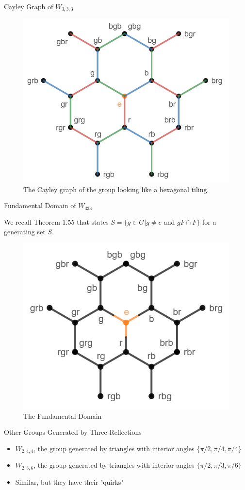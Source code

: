 \documentclass[usenames,dvipsnames]{beamer}
\begin{document}
\begin{frame}{Cayley Graph of $W_{3,3,3}$}
\begin{figure}[h]
    \centering
    \includegraphics[width=.6\textwidth]{images/6-06-rbg_rbg_3-cayley.png}
    \caption{The Cayley graph of the group looking like a hexagonal tiling.}
\end{figure}

\end{frame}

\begin{frame}{Fundamental Domain of $W_{333}$}

We recall Theorem 1.55 that states $S=\{g\in G | g \ne e$ and $gF \cap F\}$ for a generating set $S$.

\pause{}

\begin{figure}[h]
    \centering
    \includegraphics[width=.55\textwidth]{images/6-07-rbg_rbg_3-fundamental_domain.png}
    \caption{The Fundamental Domain}
\end{figure}

\end{frame}

\begin{frame}{Other Groups Generated by Three Reflections}

\begin{itemize}
  \item $W_{2,4,4}$, the group generated by triangles with interior angles $\{\pi/2,\pi/4,\pi/4\}$
  \item $W_{2,3,6}$, the group generated by triangles with interior angles $\{\pi/2,\pi/3,\pi/6\}$
  \item Similar, but they have their "quirks"
\end{itemize}

\end{frame}
\end{document}
